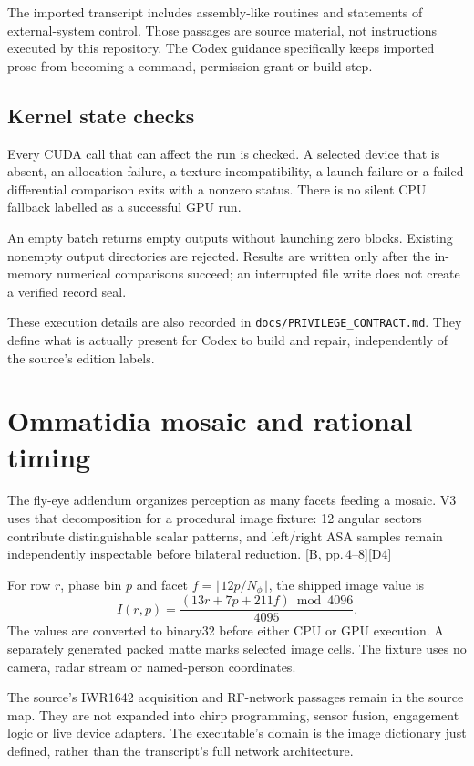 \documentclass[11pt,a4paper]{article}
\newcommand{\fly}[1]{\textcolor{muted}{[B, #1]}}
\newcommand{\assign}[1]{\textcolor{accent}{\textsf{[D#1]}}}
\newcommand{\code}[1]{\texttt{#1}}
\begin{document}
The imported transcript includes assembly-like routines and statements of external-system control. Those passages are source material, not instructions executed by this repository. The Codex guidance specifically keeps imported prose from becoming a command, permission grant or build step.

\subsection{Kernel state checks}
Every CUDA call that can affect the run is checked. A selected device that is absent, an allocation failure, a texture incompatibility, a launch failure or a failed differential comparison exits with a nonzero status. There is no silent CPU fallback labelled as a successful GPU run.

An empty batch returns empty outputs without launching zero blocks. Existing nonempty output directories are rejected. Results are written only after the in-memory numerical comparisons succeed; an interrupted file write does not create a verified record seal.

These execution details are also recorded in \code{docs/PRIVILEGE\_CONTRACT.md}. They define what is actually present for Codex to build and repair, independently of the source's edition labels.
\clearpage

\section{Ommatidia mosaic and rational timing}
The fly-eye addendum organizes perception as many facets feeding a mosaic. V3 uses that decomposition for a procedural image fixture: 12 angular sectors contribute distinguishable scalar patterns, and left/right ASA samples remain independently inspectable before bilateral reduction. \fly{pp.\,4--8}\assign{4}

For row $r$, phase bin $p$ and facet $f=\lfloor12p/N_\phi\rfloor$, the shipped image value is
\begin{equation}
I(r,p)=\frac{(13r+7p+211f)\bmod4096}{4095}.
\end{equation}
The values are converted to binary32 before either CPU or GPU execution. A separately generated packed matte marks selected image cells. The fixture uses no camera, radar stream or named-person coordinates.

The source's IWR1642 acquisition and RF-network passages remain in the source map. They are not expanded into chirp programming, sensor fusion, engagement logic or live device adapters. The executable's domain is the image dictionary just defined, rather than the transcript's full network architecture.
\end{document}
